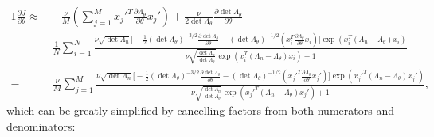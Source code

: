 \documentclass[a4paper]{article}
\begin{document}
\begin{alignat*}{1}
\frac{\partial J}{\partial \theta} \approx \ &-\frac{\nu}{M} \left( \sum_{j=1}^M {x_j'}^T \frac{\partial \Lambda_\theta}{\partial \theta} x_j'\right) + \frac{ \nu}{2 \det \Lambda_\theta} \frac{\partial \det \Lambda_\theta}{\partial \theta} -\\
- \ &\frac{1}{N} \sum_{i=1}^N \frac{ \nu \sqrt{\det \Lambda_n} \Big[ -\frac{1}{2} (\det \Lambda_\theta)^{-3/2} \frac{\partial \det \Lambda_\theta}{\partial \theta} - (\det \Lambda_\theta)^{-1/2} \left( x_i^T \frac{\partial \Lambda_\theta}{\partial \theta} x_i\right)\Big] \exp\left(x_i^T (\Lambda_n - \Lambda_\theta)x_i\right)}{\nu \sqrt{\frac{\det \Lambda_n}{\det \Lambda_\theta}} \exp\left(x_i^T (\Lambda_n - \Lambda_\theta)x_i\right) + 1} -\\
- \ &\frac{\nu}{M} \sum_{j=1}^M \frac{ \nu \sqrt{\det \Lambda_n} \Big[ -\frac{1}{2} (\det \Lambda_\theta)^{-3/2} \frac{\partial \det \Lambda_\theta}{\partial \theta} - (\det \Lambda_\theta)^{-1/2} \left( {x_j'}^T \frac{\partial \Lambda_\theta}{\partial \theta} {x_j'}\right)\Big] \exp\left({x_j'}^T (\Lambda_n - \Lambda_\theta){x_j'}\right)}{\nu \sqrt{\frac{\det \Lambda_n}{\det \Lambda_\theta}} \exp\left({x_j'}^T (\Lambda_n - \Lambda_\theta){x_j'}\right) + 1},
\end{alignat*}
which can be greatly simplified by cancelling factors from both numerators and denominators:
\end{document}
